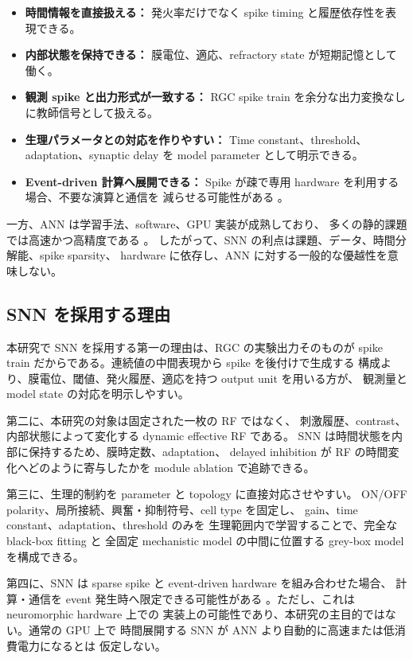\documentclass[a4paper,10pt,twocolumn,uplatex,dvipdfmx]{jsarticle}
\begin{document}
\begin{itemize}
  \item \textbf{時間情報を直接扱える：}
        発火率だけでなく spike timing と履歴依存性を表現できる。
  \item \textbf{内部状態を保持できる：}
        膜電位、適応、refractory state が短期記憶として働く。
  \item \textbf{観測 spike と出力形式が一致する：}
        RGC spike train を余分な出力変換なしに教師信号として扱える。
  \item \textbf{生理パラメータとの対応を作りやすい：}
        Time constant、threshold、adaptation、synaptic delay を
        model parameter として明示できる。
  \item \textbf{Event-driven 計算へ展開できる：}
        Spike が疎で専用 hardware を利用する場合、不要な演算と通信を
        減らせる可能性がある \cite{roy2019,davies2018}。
\end{itemize}

一方、ANN は学習手法、software、GPU 実装が成熟しており、
多くの静的課題では高速かつ高精度である \cite{lecun2015}。
したがって、SNN の利点は課題、データ、時間分解能、spike sparsity、
hardware に依存し、ANN に対する一般的な優越性を意味しない。

\subsection{SNN を採用する理由}

本研究で SNN を採用する第一の理由は、RGC の実験出力そのものが
spike train だからである。連続値の中間表現から spike を後付けで生成する
構成より、膜電位、閾値、発火履歴、適応を持つ output unit を用いる方が、
観測量と model state の対応を明示しやすい。

第二に、本研究の対象は固定された一枚の RF ではなく、
刺激履歴、contrast、内部状態によって変化する dynamic effective RF である。
SNN は時間状態を内部に保持するため、膜時定数、adaptation、
delayed inhibition が RF の時間変化へどのように寄与したかを
module ablation で追跡できる。

第三に、生理的制約を parameter と topology に直接対応させやすい。
ON/OFF polarity、局所接続、興奮・抑制符号、cell type を固定し、
gain、time constant、adaptation、threshold のみを
生理範囲内で学習することで、完全な black-box fitting と
全固定 mechanistic model の中間に位置する grey-box model を構成できる。

第四に、SNN は sparse spike と event-driven hardware を組み合わせた場合、
計算・通信を event 発生時へ限定できる可能性がある
\cite{roy2019,davies2018}。ただし、これは neuromorphic hardware 上での
実装上の可能性であり、本研究の主目的ではない。通常の GPU 上で
時間展開する SNN が ANN より自動的に高速または低消費電力になるとは
仮定しない。
\end{document}
